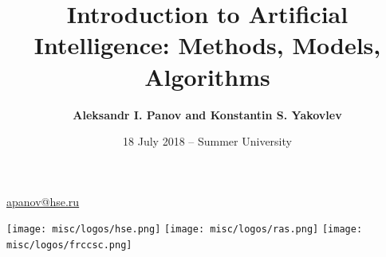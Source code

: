 \documentclass[default]{beamer}
\begin{document}
	
	\title[Introduction to AI]{Introduction to Artificial Intelligence: Methods, Models, Algorithms}
	\author[Panov]{\textbf{Aleksandr I. Panov and Konstantin S. Yakovlev}}
	\date{18 July 2018 -- Summer University} 
	
	{
	\begin{frame}
		
		\titlepage
		\centering
		\href{mailto:apanov@hse.ru}{apanov@hse.ru}
		
		\texttt{[image: misc/logos/hse.png]} \hspace{10pt}
		\texttt{[image: misc/logos/ras.png]} \hspace{10pt}
		\texttt{[image: misc/logos/frccsc.png]}
		
	\end{frame}
	}	
\end{document}
